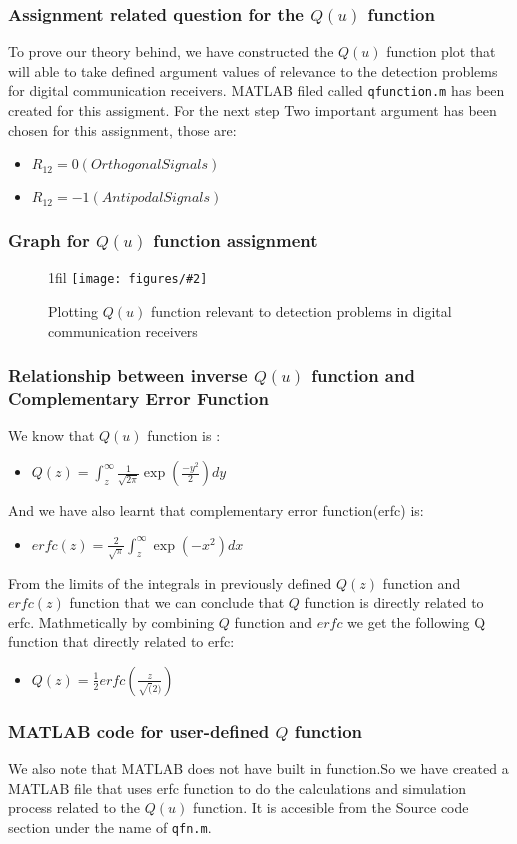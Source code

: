 \documentclass{beamer}
\makeatletter
\newcommand{\code}[1]{\texttt{#1}}
\newcommand*{\centerfloat}{%
  \parindent \z@
  \leftskip \z@ \@plus 1fil \@minus \textwidth
  \rightskip\leftskip
  \parfillskip \z@skip}
\newcommand{\fig}[3]{
  \begin{figure}[H]
  \centerfloat
    \texttt{[image: figures/\#2]}
    \caption{#3}
  \end{figure}
}
\makeatother
\begin{document}
\begin{frame}
	\frametitle{Assignment related question for the $Q(u)$ function}
To prove our theory behind, we have constructed the $Q(u)$ function plot that will able to take defined argument
values of relevance to the detection problems for digital communication receivers. MATLAB filed called \code{qfunction.m} has been created for this assigment. For the next step 
Two important argument has been chosen for this assignment, those are:
	\begin{itemize}
		\item $R_12= 0 (Orthogonal Signals)$
		\item $R_12= -1( Antipodal Signals) $
	\end{itemize}
\end{frame}

\begin{frame}
	\frametitle{Graph for $Q(u)$ function assignment}
\fig{5cm}{question2_32_4.png}{Plotting $Q(u)$ function relevant to detection problems in digital communication receivers}
\end{frame}

\begin{frame}
	\frametitle{Relationship between inverse $Q(u)$ function and Complementary Error Function }
We know that $Q(u)$ function is :
\begin{itemize}
	\item $Q(z) = \int_{z}^{\infty} \frac{1}{\sqrt{2 \pi}} \exp(\frac{-y^2} {2}) dy$
\end{itemize}

And we have also learnt that complementary error function(erfc) is:
\begin{itemize}
	\item $erfc(z)= \frac{2}{\sqrt{\pi}} \int_{z}^{\infty} \exp(-x^2) dx$
\end{itemize}

From the limits of the integrals in previously defined $Q(z)$ function and $erfc(z)$ function that we can conclude that $Q$ function is directly related to erfc. Mathmetically by combining $Q$ function and $erfc$  we get the following Q function that directly related to erfc:

\begin{itemize}
	\item $Q(z)= \frac{1}{2} erfc(\frac{z}{\sqrt(2)})$
\end{itemize}
\end{frame}

\begin{frame}
	\frametitle{MATLAB code for user-defined $Q$ function}
We also note that MATLAB does not have built in function.So we have created a MATLAB file that uses erfc function to do the calculations and simulation process related to the $Q(u)$ function. It is accesible from the Source code section under the name of \code{qfn.m}.
\end{frame}
\end{document}
